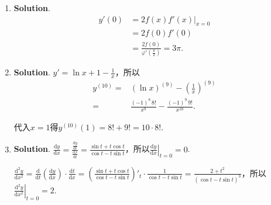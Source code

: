 \documentclass[../Main.tex]{subfiles}
\begin{document}
\begin{enumerate}
    \item \textbf{Solution}.
          \[
              \begin{aligned}
                  y'(0) & =\left.2f(x)f'(x)\right|_{x=0}                          \\
                        & = 2f(0)f'(0)                                            \\
                        & =\frac{2f(0)}{\varphi'\left(\frac{\pi}{2}\right)}=3\pi.
              \end{aligned}
          \]

    \item \textbf{Solution}. $y'=\ln x+1-\frac{1}{x}$，所以
          \[
              \begin{aligned}
                  y^{(10)}= & \left(\ln x\right)^{(9)}-\left(\frac{1}{x}\right)^{(9)} \\
                  =         & \frac{(-1)^8\,8!}{x^9}-\frac{(-1)^9\,9!}{x^{10}}.
              \end{aligned}
          \]

          代入$x=1$得$y^{(10)}(1)=8!+9!=10\cdot8!$.

    \item \textbf{Solution}. $\frac{\mathrm{d}y}{\mathrm{d}x}=\frac{\frac{\mathrm{d}y}{\mathrm{d}t}}{\frac{\mathrm{d}x}{\mathrm{d}t}}
              =\frac{\sin t+t\cos t}{\cos t-t\sin t}$，所以$\left.\frac{\mathrm{d}y}{\mathrm{d}x}
              \right|_{t=0}=0$.

          $\frac{\mathrm{d}^{2}y}{\mathrm{d}x^{2}}=\frac{\mathrm{d}}{\mathrm{d}t}\left
              (\frac{\mathrm{d}y}{\mathrm{d}x}\right)\cdot\frac{\mathrm{d}t}{\mathrm{d}x}
              =\left(\frac{\sin t+t\cos t}{\cos t-t\sin t}\right)'_{t}\cdot\frac{1}{\cos
                  t-t\sin t}=\frac{2+t^{2}}{(\cos t-t\sin t)^{3}}$，所以$\left.\frac{\mathrm{d}^{2}y}{\mathrm{d}x^{2}}
              \right|_{t=0}=2$.
\end{enumerate}
\end{document}
